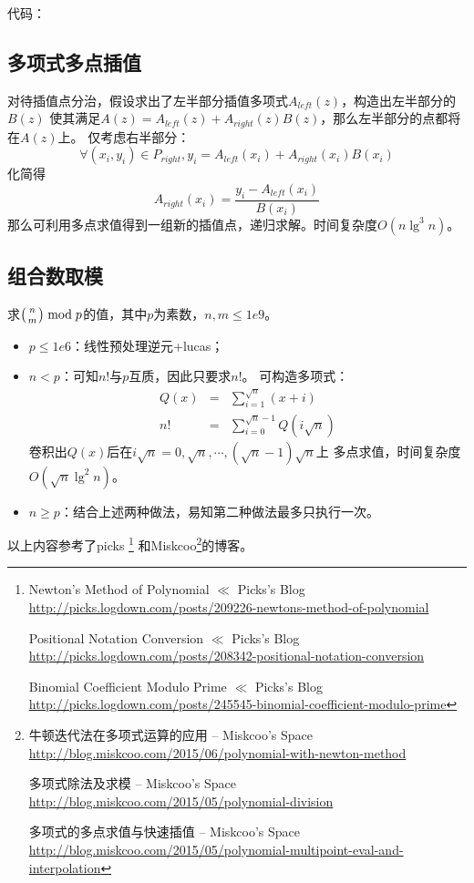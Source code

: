 代码：

\subsection{多项式多点插值}

对待插值点分治，假设求出了左半部分插值多项式$A_{left}(z)$，构造出左半部分的$B(z)$
使其满足$A(z)=A_{left}(z)+A_{right}(z)B(z)$，那么左半部分的点都将在$A(z)$上。
仅考虑右半部分：
\begin{displaymath}
    \forall(x_i,y_i)\in P_{right},y_i=A_{left}(x_i)+A_{right}(x_i)B(x_i)
\end{displaymath}
化简得
\begin{displaymath}
    A_{right}(x_i)=\frac{y_i-A_{left}(x_i)}{B(x_i)}
\end{displaymath}
那么可利用多点求值得到一组新的插值点，递归求解。时间复杂度$O(n \lg^3 n)$。

\subsection{组合数取模}

求$\left(n \atop m\right) \bmod{p}$的值，其中$p$为素数，$n,m\leq 1e9$。

\begin{itemize}
    \item $p\leq 1e6$：线性预处理逆元+lucas；
    \item $n<p$：可知$n!$与$p$互质，因此只要求$n!$。
    可构造多项式：
    \begin{eqnarray*}
        Q(x)&=&\sum_{i=1}^{\sqrt{n}}{(x+i)}\\
        n!&=&\sum_{i=0}^{\sqrt{n}-1}{Q(i\sqrt{n})}
    \end{eqnarray*}
    卷积出$Q(x)$后在$i\sqrt{n}=0,\sqrt{n},\cdots,(\sqrt{n}-1)\sqrt{n}$上
    多点求值，时间复杂度$O(\sqrt{n}\lg^2 n)$。
    \item $n\geq p$：结合上述两种做法，易知第二种做法最多只执行一次。
\end{itemize}

以上内容参考了picks
\footnote{
Newton's Method of Polynomial $\ll$ Picks's Blog
\\\url{http://picks.logdown.com/posts/209226-newtons-method-of-polynomial}

Positional Notation Conversion $\ll$ Picks's Blog
\\\url{http://picks.logdown.com/posts/208342-positional-notation-conversion}

Binomial Coefficient Modulo Prime $\ll$ Picks's Blog
\\\url{http://picks.logdown.com/posts/245545-binomial-coefficient-modulo-prime}

}
和Miskcoo\footnote{
牛顿迭代法在多项式运算的应用 – Miskcoo's Space
\\\url{http://blog.miskcoo.com/2015/06/polynomial-with-newton-method}

多项式除法及求模 – Miskcoo's Space
\\\url{http://blog.miskcoo.com/2015/05/polynomial-division}

多项式的多点求值与快速插值 – Miskcoo's Space
\\\url{http://blog.miskcoo.com/2015/05/polynomial-multipoint-eval-and-interpolation}
}的博客。
